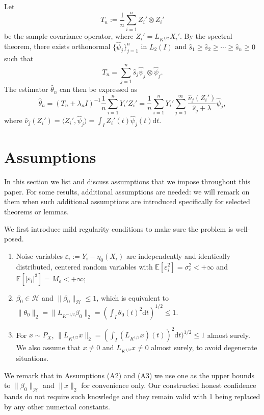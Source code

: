\documentclass[11pt,a4paper]{article}
\renewcommand{\hat}{\widehat}
\theoremstyle{definition}
\theoremstyle{plain}
\theoremstyle{remark}
\newcommand{\ud}{\mathrm d}
\newcommand{\mH}{\mathcal H}
\begin{document}
Let
$$
T_n := \frac{1}{n}\sum_{i=1}^n Z_i'\otimes Z_i'
$$
be the sample covariance operator, where $Z_i'=L_{K^{1/2}}X_i'$. By the spectral theorem, there exists orthonormal $\{\hat\psi_j\}_{j=1}^n$ in $L_2(I)$ and $\hat s_1\geq \hat s_2\geq\cdots\geq \hat s_n\geq 0$ such that
$$
T_n = \sum_{j=1}^n \hat s_j\hat \psi_j\otimes\hat \psi_j.
$$
The estimator $\hat\theta_n$ can then be expressed as
\begin{equation}
\hat\theta_n = (T_n+\lambda_n I)^{-1}\frac{1}{n}\sum_{i=1}^n Y_i'Z_i' = \frac{1}{n}\sum_{i=1}^n Y_i'\sum_{j=1}^{\infty}\frac{\hat\nu_j(Z_i')}{\hat s_j+\lambda}\hat\psi_j,
\label{eq:krr-nointercept-fpca}
\end{equation}
where $\hat\nu_j(Z_i') = \langle Z_i', \hat\psi_j\rangle=\int_I Z_i'(t)\hat\psi_j(t)\ud t$.

\section{Assumptions}

In this section we list and discuss assumptions that we impose throughout this paper. For some results, additional assumptions are needed: 
we will remark on them when such additional assumptions are introduced specifically for selected theorems or lemmas.

We first introduce mild regularity conditions to make sure the problem is well-posed.
\begin{enumerate}
\item[(A1)] Noise variables $\varepsilon_i:=Y_i-\eta_0(X_i)$ are independently and identically distributed, centered random variables with $\mathbb E[\varepsilon_i^2]=\sigma_\varepsilon^2<+\infty$
and $\mathbb E[|\varepsilon_i|^3]=M_\varepsilon < +\infty$;
\item[(A2)] $\beta_0\in\mH$ and $\|\beta_0\|_\mH\leq 1$, which is equivalent to $\|\theta_0\|_2=\|L_{K^{-1/2}}\beta_0\|_2 =(\int_I \theta_0(t)^2\ud t)^{1/2} \leq 1$.
\item[(A3)] For $x\sim P_X$, $\|L_{K^{1/2}}x\|_2= (\int_I (L_{K^{1/2}}x)(t))^2\ud t)^{1/2}\leq 1$ almost surely. We also assume that $x\neq 0$ and $L_{K^{1/2}}x\neq 0$ almost surely, to avoid degenerate situations.
\end{enumerate}

We remark that in Assumptions (A2) and (A3) we use one as the upper bounds to $\|\beta_0\|_\mH$ and $\|x\|_2$ for convenience only. Our constructed honest confidence bands do not require such knowledge
and they remain valid with 1 being replaced by any other numerical constants.
\end{document}
